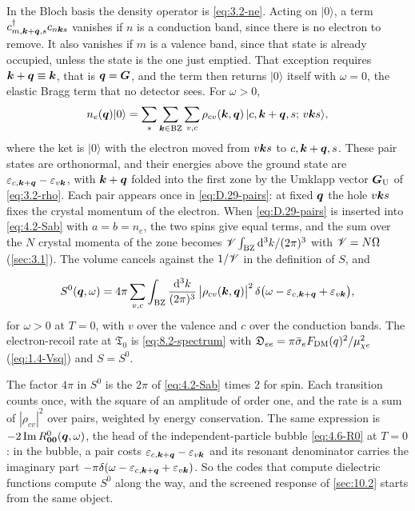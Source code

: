 In the Bloch basis the density operator is \cref{eq:3.2-ne}. Acting on $|0\rangle$, a term $c^\dagger_{m,\bm{k}+\bm{q},s}c_{n\bm{k}s}$ vanishes if $n$ is a conduction band, since there is no electron to remove. It also vanishes if $m$ is a valence band, since that state is already occupied, unless the state is the one just emptied. That exception requires $\bm{k} + \bm{q} \equiv \bm{k}$, that is $\bm{q} = \bm{G}$, and the term then returns $|0\rangle$ itself with $\omega = 0$, the elastic Bragg term that no detector sees. For $\omega > 0$,
\begin{equation}
  n_e(\bm{q})|0\rangle = \sum_s\sum_{\bm{k}\in\mathrm{BZ}}\sum_{v,c}\rho_{cv}(\bm{k},\bm{q})\,|c,\bm{k}+\bm{q},s;\,v\bm{k}s\rangle ,
  \label{eq:D.29-pairs}
\end{equation}
where the ket is $|0\rangle$ with the electron moved from $v\bm{k}s$ to $c,\bm{k}+\bm{q},s$. These pair states are orthonormal, and their energies above the ground state are $\varepsilon_{c,\bm{k}+\bm{q}} - \varepsilon_{v\bm{k}}$, with $\bm{k} + \bm{q}$ folded into the first zone by the Umklapp vector $\bm{G}_{\mathrm{U}}$ of \cref{eq:3.2-rho}. Each pair appears once in \cref{eq:D.29-pairs}: at fixed $\bm{q}$ the hole $v\bm{k}s$ fixes the crystal momentum of the electron. When \cref{eq:D.29-pairs} is inserted into \cref{eq:4.2-Sab} with $a = b = n_e$, the two spins give equal terms, and the sum over the $N$ crystal momenta of the zone becomes $\mathscr{V}\int_{\mathrm{BZ}}\mathrm{d}^3k/(2\pi)^3$ with $\mathscr{V} = N\Omega$ (\cref{sec:3.1}). The volume cancels against the $1/\mathscr{V}$ in the definition of $S$, and
\begin{keyresult}
\begin{equation}
  S^0(\bm{q},\omega) = 4\pi\sum_{v,c}\int_{\mathrm{BZ}}\frac{\mathrm{d}^3k}{(2\pi)^3}\,\bigl|\rho_{cv}(\bm{k},\bm{q})\bigr|^2\,\delta\bigl(\omega - \varepsilon_{c,\bm{k}+\bm{q}} + \varepsilon_{v\bm{k}}\bigr) ,
  \label{eq:10.1-S0}
\end{equation}
for $\omega > 0$ at $T = 0$, with $v$ over the valence and $c$ over the conduction bands. The electron-recoil rate at $\mathfrak{T}_0$ is \cref{eq:8.2-spectrum} with $\mathfrak{D}_{ee} = \pi\bar{\sigma}_{e}F_{\mathrm{DM}}(q)^2/\mu_{\chi e}^2$ (\cref{eq:1.4-Vsq}) and $S = S^0$.
\end{keyresult}
\noindent The factor $4\pi$ in $S^0$ is the $2\pi$ of \cref{eq:4.2-Sab} times 2 for spin. Each transition counts once, with the square of an amplitude of order one, and the rate is a sum of $|\rho_{cv}|^2$ over pairs, weighted by energy conservation. The same expression is $-2\operatorname{Im} R^0_{\bm{0}\bm{0}}(\bm{q},\omega)$, the head of the independent-particle bubble \cref{eq:4.6-R0} at $T = 0$: in the bubble, a pair costs $\varepsilon_{c,\bm{k}+\bm{q}} - \varepsilon_{v\bm{k}}$ and its resonant denominator carries the imaginary part $-\pi\delta(\omega - \varepsilon_{c,\bm{k}+\bm{q}} + \varepsilon_{v\bm{k}})$. So the codes that compute dielectric functions compute $S^0$ along the way, and the screened response of \cref{sec:10.2} starts from the same object.

